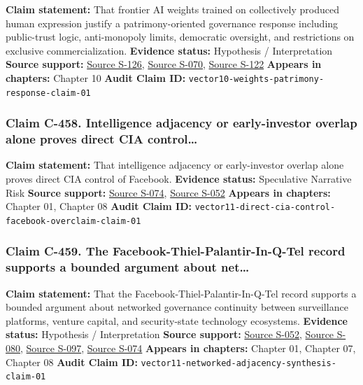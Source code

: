 \documentclass[
  american,
  11pt,
  letterpaper,
]{article}
\begin{document}
\textbf{Claim statement:} That frontier AI weights trained on
collectively produced human expression justify a patrimony-oriented
governance response including public-trust logic, anti-monopoly limits,
democratic oversight, and restrictions on exclusive commercialization.
\textbf{Evidence status:} Hypothesis / Interpretation \textbf{Source
support:}
\hyperref[source-s-126-copyright-and-artificial-intelligence-part-3-generative-ai-training-pre-publication-version]{Source
S-126},
\hyperref[source-s-070-bipartisan-house-task-force-report-on-artificial-intelligence]{Source
S-070},
\hyperref[source-s-122-ai-copyright-weights-a-new-frontier-in-intellectual-property-law]{Source
S-122} \textbf{Appears in chapters:} Chapter 10 \textbf{Audit Claim ID:}
\texttt{vector10-weights-patrimony-response-claim-01}

\subsubsection{Claim C-458. Intelligence adjacency or early-investor
overlap alone proves direct CIA
control\ldots{}}\label{claim-c-458-intelligence-adjacency-or-early-investor-overlap-alone-proves-direct-cia-control}

\textbf{Claim statement:} That intelligence adjacency or early-investor
overlap alone proves direct CIA control of Facebook. \textbf{Evidence
status:} Speculative Narrative Risk \textbf{Source support:}
\hyperref[source-s-074-in-q-tel]{Source S-074},
\hyperref[source-s-052-facebook-inc-registration-statement-on-form-s-1]{Source
S-052} \textbf{Appears in chapters:} Chapter 01, Chapter 08
\textbf{Audit Claim ID:}
\texttt{vector11-direct-cia-control-facebook-overclaim-claim-01}

\subsubsection{Claim C-459. The Facebook-Thiel-Palantir-In-Q-Tel record
supports a bounded argument about
net\ldots{}}\label{claim-c-459-the-facebook-thiel-palantir-in-q-tel-record-supports-a-bounded-argument-about-net}

\textbf{Claim statement:} That the Facebook-Thiel-Palantir-In-Q-Tel
record supports a bounded argument about networked governance continuity
between surveillance platforms, venture capital, and security-state
technology ecosystems. \textbf{Evidence status:} Hypothesis /
Interpretation \textbf{Source support:}
\hyperref[source-s-052-facebook-inc-registration-statement-on-form-s-1]{Source
S-052},
\hyperref[source-s-080-meta-platforms-inc-2022-definitive-proxy-statement]{Source
S-080}, \hyperref[source-s-097-about-palantir]{Source S-097},
\hyperref[source-s-074-in-q-tel]{Source S-074} \textbf{Appears in
chapters:} Chapter 01, Chapter 07, Chapter 08 \textbf{Audit Claim ID:}
\texttt{vector11-networked-adjacency-synthesis-claim-01}
\end{document}
